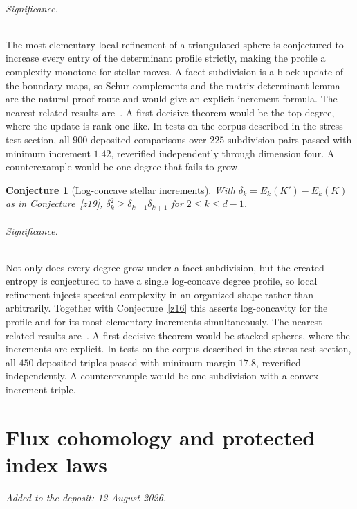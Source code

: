 \documentclass[11pt]{article}
\newtheorem{conjecture}{Conjecture}
\theoremstyle{definition}
\begin{document}
\paragraph{Significance.}
The most elementary local refinement of a triangulated sphere is conjectured to increase every entry of the determinant profile strictly, making the profile a complexity monotone for stellar moves.  A facet subdivision is a block update of the boundary maps, so Schur complements and the matrix determinant lemma are the natural proof route and would give an explicit increment formula.  The nearest related results are~\cite{DKM09,MMRW15}.  A first decisive theorem would be the top degree, where the update is rank-one-like.  In tests on the corpus described in the stress-test section, all $900$ deposited comparisons over $225$ subdivision pairs passed with minimum increment $1.42$, reverified independently through dimension four.  A counterexample would be one degree that fails to grow.

\begin{conjecture}[Log-concave stellar increments]\label{z20}
With $\delta_k=E_k(K')-E_k(K)$ as in Conjecture~\ref{z19}, $\delta_k^2\ge\delta_{k-1}\delta_{k+1}$ for $2\le k\le d-1$.
\end{conjecture}

\paragraph{Significance.}
Not only does every degree grow under a facet subdivision, but the created entropy is conjectured to have a single log-concave degree profile, so local refinement injects spectral complexity in an organized shape rather than arbitrarily.  Together with Conjecture~\ref{z16} this asserts log-concavity for the profile and for its most elementary increments simultaneously.  The nearest related results are~\cite{DKM09,MMRW15}.  A first decisive theorem would be stacked spheres, where the increments are explicit.  In tests on the corpus described in the stress-test section, all $450$ deposited triples passed with minimum margin $17.8$, reverified independently.  A counterexample would be one subdivision with a convex increment triple.

\part{Flux cohomology and protected index laws}

\medskip\noindent\emph{Added to the deposit: 12 August 2026.}\par\medskip
\end{document}
